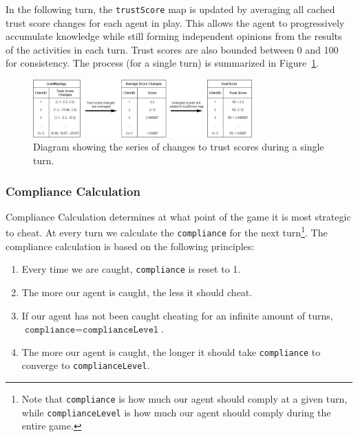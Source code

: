 \documentclass{article}
\begin{document}
In the following turn, the \texttt{trustScore} map is updated by averaging all cached trust score changes for each agent in play. This allows the agent to progressively accumulate knowledge while still forming independent opinions from the results of the activities in each turn. Trust scores are also bounded between 0 and 100 for consistency. The process (for a single turn) is summarized in Figure~\ref{fig:trust_scores}.\\

\begin{figure}[H] 
\centering
\includegraphics[width=0.75\textwidth]{figures/TrustScores.jpg}
\caption{Diagram showing the series of changes to trust scores during a single turn.}
\label{fig:trust_scores}
\end{figure}


\subsubsection*{Compliance Calculation}
Compliance Calculation determines at what point of the game it is most strategic to cheat. At every turn we calculate the \texttt{compliance} for the next turn\footnote{Note that \texttt{compliance} is how much our agent should comply at a given turn, while \texttt{complianceLevel} is how much our agent should comply during the entire game.}. The compliance calculation is based on the following principles:
\begin{enumerate}
    \item Every time we are caught, \texttt{compliance} is reset to 1.
    \item The more our agent is caught, the less it should cheat.
    \item If our agent has not been caught cheating for an infinite amount of turns, $\texttt{compliance}=\texttt{complianceLevel}$.
    \item The more our agent is caught, the longer it should take \texttt{compliance} to converge to \texttt{complianceLevel}.
\end{enumerate}
\end{document}
